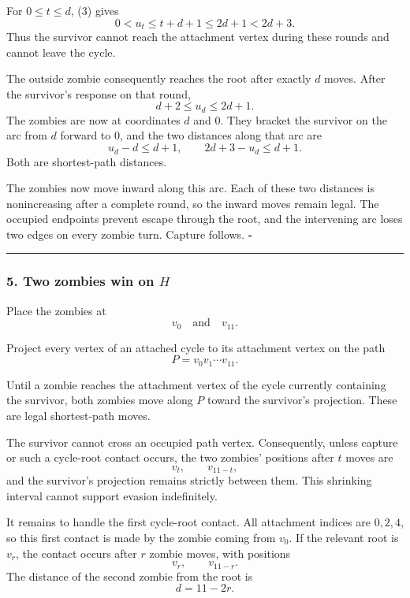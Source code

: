 \documentclass[
  11pt,
  a4paper,
]{article}
\begin{document}
For \(0\le t\le d\), (3) gives \[
0<u_t\le t+d+1\le2d+1<2d+3.
\] Thus the survivor cannot reach the attachment vertex during these
rounds and cannot leave the cycle.

The outside zombie consequently reaches the root after exactly \(d\)
moves. After the survivor's response on that round, \[
d+2\le u_d\le2d+1.
\] The zombies are now at coordinates \(d\) and \(0\). They bracket the
survivor on the arc from \(d\) forward to \(0\), and the two distances
along that arc are \[
u_d-d\le d+1,
\qquad
2d+3-u_d\le d+1.
\] Both are shortest-path distances.

The zombies now move inward along this arc. Each of these two distances
is nonincreasing after a complete round, so the inward moves remain
legal. The occupied endpoints prevent escape through the root, and the
intervening arc loses two edges on every zombie turn. Capture follows.
\(\square\)

\begin{center}\rule{0.5\linewidth}{0.5pt}\end{center}

\subsubsection{\texorpdfstring{5. Two zombies win on
\(H\)}{5. Two zombies win on H}}\label{two-zombies-win-on-h}

Place the zombies at \[
v_0\quad\text{and}\quad v_{11}.
\]

Project every vertex of an attached cycle to its attachment vertex on
the path \[
P=v_0v_1\cdots v_{11}.
\]

Until a zombie reaches the attachment vertex of the cycle currently
containing the survivor, both zombies move along \(P\) toward the
survivor's projection. These are legal shortest-path moves.

The survivor cannot cross an occupied path vertex. Consequently, unless
capture or such a cycle-root contact occurs, the two zombies' positions
after \(t\) moves are \[
v_t,\qquad v_{11-t},
\] and the survivor's projection remains strictly between them. This
shrinking interval cannot support evasion indefinitely.

It remains to handle the first cycle-root contact. All attachment
indices are \(0,2,4\), so this first contact is made by the zombie
coming from \(v_0\). If the relevant root is \(v_r\), the contact occurs
after \(r\) zombie moves, with positions \[
v_r,\qquad v_{11-r}.
\] The distance of the second zombie from the root is \[
d=11-2r.
\]
\end{document}
